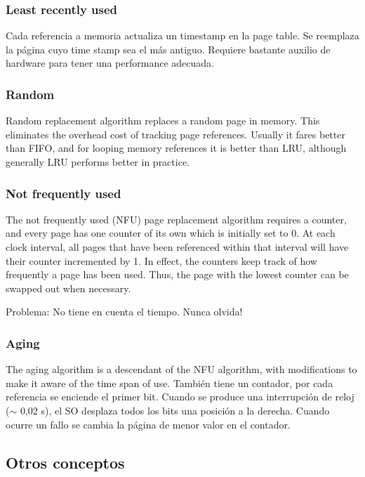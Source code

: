 \documentclass[a4paper, twoside]{article}
\begin{document}
\subsubsection{Least recently used}

Cada referencia a memoria actualiza un timestamp en la page table.
Se reemplaza la página cuyo time stamp sea el más antiguo.
Requiere bastante auxilio de hardware para tener una performance adecuada.

\subsubsection{Random}

Random replacement algorithm replaces a random page in memory.
This eliminates the overhead cost of tracking page references.
Usually it fares better than FIFO, and for looping memory references it is
better than LRU, although generally LRU performs better in practice.

\subsubsection{Not frequently used}

The not frequently used (NFU) page replacement algorithm requires a counter,
and every page has one counter of its own which is initially set to 0.
At each clock interval, all pages that have been referenced within that
interval will have their counter incremented by 1.
In effect, the counters keep track of how frequently a page has been used.
Thus, the page with the lowest counter can be swapped out when necessary.

Problema: No tiene en cuenta el tiempo. Nunca olvida!

\subsubsection{Aging}

The aging algorithm is a descendant of the NFU algorithm, with modifications to
make it aware of the time span of use.
También tiene un contador, por cada referencia se enciende el primer bit.
Cuando se produce una interrupción de reloj ($\sim$ 0,02 s), el SO desplaza
todos los bits una posición a la derecha.
Cuando ocurre un fallo se cambia la página de menor valor en el contador.

\subsection{Otros conceptos}
\end{document}
